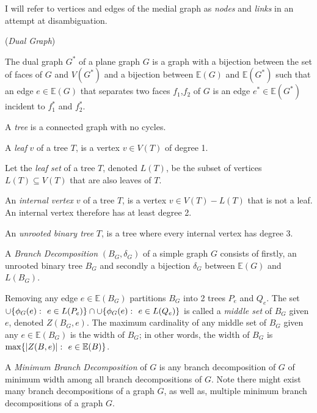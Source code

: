 \documentclass{article}
\begin{document}
	I will refer to vertices and edges of the medial graph as \textit{nodes} and \textit{links} in an attempt at disambiguation.

	\begin{definition}
		(\textit{Dual Graph})

		The dual graph $G^*$ of a plane graph $G$ is a graph with a bijection between the set of faces of $G$ and $V(G^*)$ and a bijection between $\mathbb{E}(G)$ and $\mathbb{E}(G^*)$ such that an edge $e \in \mathbb{E}(G)$ that separates two faces $f_1$,$f_2$ of $G$ is an edge $e^* \in \mathbb{E}(G^*)$ incident to $f_1^*$ and $f_2^*$.
	\end{definition}

	\begin{center}
		
	\end{center}

	A \textit{tree} is a connected graph with no cycles.

	A \textit{leaf} $v$ of a tree $T$, is a vertex $v \in V(T)$ of degree 1.

	Let the \textit{leaf set} of a tree $T$, denoted $L(T)$, be the subset of vertices $L(T) \subseteq V(T)$ that are also leaves of $T$.
	
	An \textit{internal vertex} $v$ of a tree $T$, is a vertex $v \in V(T) - L(T)$ that is not a leaf. An internal vertex therefore has at least degree 2.

	An \textit{unrooted binary tree} $T$, is a tree where every internal vertex has degree 3.

	A \textit{Branch Decomposition} $(B_G, \delta_G)$ of a simple graph $G$ consists of firstly, an unrooted binary tree $B_G$ and secondly a bijection $\delta_G$ between $\mathbb{E}(G)$ and $L(B_G)$.

	Removing any edge $e \in \mathbb{E}(B_G)$ partitions $B_G$ into 2 trees $P_e$ and $Q_e$. The set $\cup\{\phi_G(e) \,\colon\  e \in L(P_e)\} \cap \cup\{\phi_G(e) \,\colon\  e \in L(Q_e)\}$ is called a \textit{middle set} of $B_G$ given $e$, denoted $Z(B_G,e)$. The maximum cardinality of any middle set of $B_G$ given any $e \in \mathbb{E}(B_G)$ is the width of $B_G$; in other words, the width of $B_G$ is $\max\{ |Z(B, e)| \,\colon\  e \in \mathbb{E}(B) \}$.

	A \textit{Minimum Branch Decomposition} of $G$ is any branch decomposition of $G$ of minimum width among all branch decompositions of $G$. Note there might exist many branch decompositions of a graph $G$, as well as, multiple minimum branch decompositions of a graph $G$.
\end{document}
